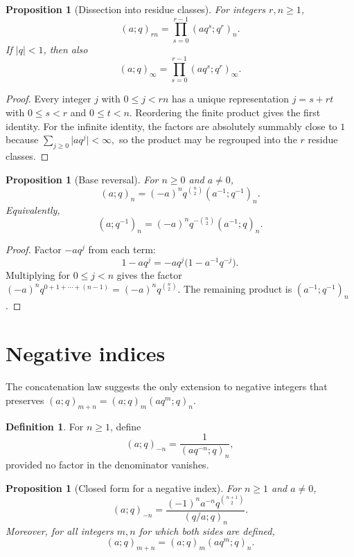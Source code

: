 \documentclass[11pt,oneside,openany]{book}
\newtheorem{proposition}[theorem]{Proposition}
\theoremstyle{definition}
\newtheorem{definition}[theorem]{Definition}
\theoremstyle{remark}
\newcommand{\abs}[1]{\lvert #1\rvert}
\begin{document}
\begin{proposition}[Dissection into residue classes]\label{prop:dissection}
For integers $r,n\ge1$,
\[
 (a;q)_{rn}=\prod_{s=0}^{r-1}(aq^s;q^r)_n.
\]
If $\abs q<1$, then also
\[
 (a;q)_\infty=\prod_{s=0}^{r-1}(aq^s;q^r)_\infty.
\]
\end{proposition}

\begin{proof}
Every integer $j$ with $0\le j<rn$ has a unique representation $j=s+rt$ with $0\le s<r$ and $0\le t<n$.  Reordering the finite product gives the first identity.  For the infinite identity, the factors are absolutely summably close to $1$ because
\(
 \sum_{j\ge0}\abs{a q^j}<\infty,
\)
so the product may be regrouped into the $r$ residue classes.
\end{proof}

\begin{proposition}[Base reversal]\label{prop:base-reversal}
For $n\ge0$ and $a\ne0$,
\[
 (a;q)_n=(-a)^n q^{\binom n2}(a^{-1};q^{-1})_n.
\]
Equivalently,
\[
 (a;q^{-1})_n=(-a)^nq^{-\binom n2}(a^{-1};q)_n.
\]
\end{proposition}

\begin{proof}
Factor $-aq^j$ from each term:
\[
 1-aq^j=-aq^j\bigl(1-a^{-1}q^{-j}\bigr).
\]
Multiplying for $0\le j<n$ gives the factor
\(
 (-a)^nq^{0+1+\cdots+(n-1)}=(-a)^nq^{\binom n2}.
\)
The remaining product is $(a^{-1};q^{-1})_n$.
\end{proof}

\section{Negative indices}

The concatenation law suggests the only extension to negative integers that preserves
\((a;q)_{m+n}=(a;q)_m(aq^m;q)_n\).

\begin{definition}
For $n\ge1$, define
\[
 (a;q)_{-n}=\frac{1}{(aq^{-n};q)_n},
\]
provided no factor in the denominator vanishes.
\end{definition}

\begin{proposition}[Closed form for a negative index]\label{prop:negative-index}
For $n\ge1$ and $a\ne0$,
\[
 (a;q)_{-n}
 =\frac{(-1)^n a^{-n}q^{\binom{n+1}{2}}}{(q/a;q)_n}.
\]
Moreover, for all integers $m,n$ for which both sides are defined,
\[
 (a;q)_{m+n}=(a;q)_m(aq^m;q)_n.
\]
\end{proposition}
\end{document}
